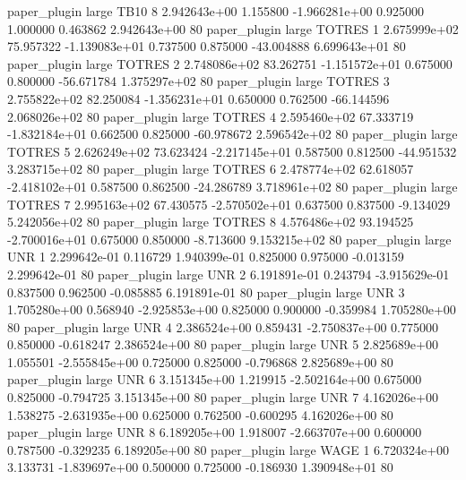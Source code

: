        paper_plugin      large     TB10                 8 2.942643e+00      1.155800 -1.966281e+00 0.925000 1.000000       0.463862 2.942643e+00 80
       paper_plugin      large   TOTRES                 1 2.675999e+02     75.957322 -1.139083e+01 0.737500 0.875000     -43.004888 6.699643e+01 80
       paper_plugin      large   TOTRES                 2 2.748086e+02     83.262751 -1.151572e+01 0.675000 0.800000     -56.671784 1.375297e+02 80
       paper_plugin      large   TOTRES                 3 2.755822e+02     82.250084 -1.356231e+01 0.650000 0.762500     -66.144596 2.068026e+02 80
       paper_plugin      large   TOTRES                 4 2.595460e+02     67.333719 -1.832184e+01 0.662500 0.825000     -60.978672 2.596542e+02 80
       paper_plugin      large   TOTRES                 5 2.626249e+02     73.623424 -2.217145e+01 0.587500 0.812500     -44.951532 3.283715e+02 80
       paper_plugin      large   TOTRES                 6 2.478774e+02     62.618057 -2.418102e+01 0.587500 0.862500     -24.286789 3.718961e+02 80
       paper_plugin      large   TOTRES                 7 2.995163e+02     67.430575 -2.570502e+01 0.637500 0.837500      -9.134029 5.242056e+02 80
       paper_plugin      large   TOTRES                 8 4.576486e+02     93.194525 -2.700016e+01 0.675000 0.850000      -8.713600 9.153215e+02 80
       paper_plugin      large      UNR                 1 2.299642e-01      0.116729  1.940399e-01 0.825000 0.975000      -0.013159 2.299642e-01 80
       paper_plugin      large      UNR                 2 6.191891e-01      0.243794 -3.915629e-01 0.837500 0.962500      -0.085885 6.191891e-01 80
       paper_plugin      large      UNR                 3 1.705280e+00      0.568940 -2.925853e+00 0.825000 0.900000      -0.359984 1.705280e+00 80
       paper_plugin      large      UNR                 4 2.386524e+00      0.859431 -2.750837e+00 0.775000 0.850000      -0.618247 2.386524e+00 80
       paper_plugin      large      UNR                 5 2.825689e+00      1.055501 -2.555845e+00 0.725000 0.825000      -0.796868 2.825689e+00 80
       paper_plugin      large      UNR                 6 3.151345e+00      1.219915 -2.502164e+00 0.675000 0.825000      -0.794725 3.151345e+00 80
       paper_plugin      large      UNR                 7 4.162026e+00      1.538275 -2.631935e+00 0.625000 0.762500      -0.600295 4.162026e+00 80
       paper_plugin      large      UNR                 8 6.189205e+00      1.918007 -2.663707e+00 0.600000 0.787500      -0.329235 6.189205e+00 80
       paper_plugin      large     WAGE                 1 6.720324e+00      3.133731 -1.839697e+00 0.500000 0.725000      -0.186930 1.390948e+01 80
